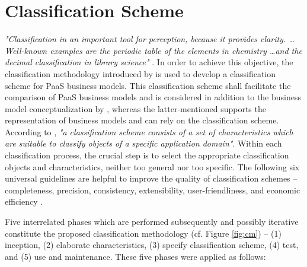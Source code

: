 \section{Classification Scheme}\label{ch:sota:cm}

\textit{"Classification in an important tool for perception, because it provides clarity. \ldots Well-known examples are the periodic table of the elements in chemistry \ldots and the decimal classification in library science"} \citep[p. 36]{Fettke2003}. In order to achieve this objective, the classification methodology introduced by \citet{Fettke2003} is used to develop a classification scheme for \ac{PaaS} business models. This classification scheme shall facilitate the comparison of \ac{PaaS} business models and is considered in addition to the business model conceptualization by \citet{Johnson2008}, whereas the latter-mentioned supports the representation of business models and can rely on the classification scheme. According to \citet[p. 39]{Fettke2003}, \textit{"a classification scheme consists of a set of characteristics which are suitable to classify objects of a specific application domain"}. Within each classification process, the crucial step is to select the appropriate classification objects and characteristics, neither too general nor too specific. The following six universal guidelines are helpful to improve the quality of classification schemes -- completeness, precision, consistency, extensibility, user-friendliness, and economic efficiency \citep[pp. 40-41]{Fettke2003}. 

Five interrelated phases which are performed subsequently and possibly iterative constitute the proposed classification methodology (cf. Figure \ref{fig:cm}) -- (1) inception, (2) elaborate characteristics, (3) specify classification scheme, (4) test, and (5) use and maintenance. These five phases were applied as follows:

